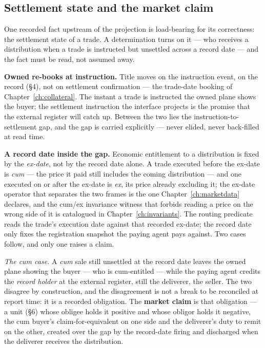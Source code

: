 \subsection{Settlement state and the market claim}

One recorded fact upstream of the projection is load-bearing for its correctness:
the settlement state of a trade. A determination turns on it --- who receives a
distribution when a trade is instructed but unsettled across a record date --- and
the fact must be read, not assumed away.

\medskip\noindent\textbf{Owned re-books at instruction.} Title moves on the
instruction event, on the record (\S4), not on settlement confirmation --- the
trade-date booking of Chapter~\ref{ch:collateral}. The instant a trade is
instructed the owned plane shows the buyer; the settlement instruction the
interface projects is the promise that the external register will catch up. Between
the two lies the instruction-to-settlement gap, and the gap is carried explicitly
--- never elided, never back-filled at read time.

\medskip\noindent\textbf{A record date inside the gap.} Economic entitlement to a
distribution is fixed by the \emph{ex-date}, not by the record date alone. A trade
executed before the ex-date is \emph{cum} --- the price it paid still includes the
coming distribution --- and one executed on or after the ex-date is \emph{ex}, its
price already excluding it; the ex-date operator that separates the two frames is the
one Chapter~\ref{ch:marketdata} declares, and the cum/ex invariance witness that
forbids reading a price on the wrong side of it is catalogued in
Chapter~\ref{ch:invariants}. The routing predicate reads the trade's execution date
against that recorded ex-date; the record date only fixes the registration snapshot
the paying agent pays against. Two cases follow, and only one raises a claim.

\emph{The cum case.} A \emph{cum} sale still unsettled at the record date leaves the
owned plane showing the buyer --- who is cum-entitled --- while the paying agent
credits the \emph{record holder} at the external register, still the deliverer, the
seller. The two disagree by construction, and the disagreement is not a break to be
reconciled at report time: it is a recorded obligation. The \textbf{market claim} is
that obligation --- a unit (\S6) whose obligee holds it positive and whose obligor
holds it negative, the cum buyer's claim-for-equivalent on one side and the
deliverer's duty to remit on the other, created over the gap by the record-date firing
and discharged when the deliverer receives the distribution.

